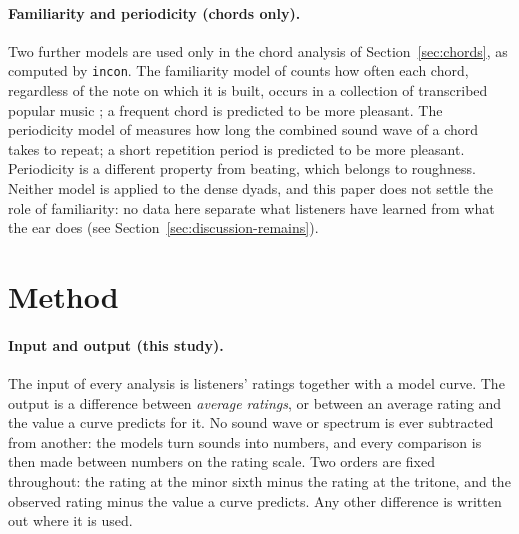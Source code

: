 \documentclass[11pt,a4paper]{article}
\begin{document}
\paragraph{Familiarity and periodicity (chords only).}
Two further models are used only in the chord analysis of Section~\ref{sec:chords}, as
computed by \texttt{incon}. The familiarity model of \citet{harrison2020} counts how often
each chord, regardless of the note on which it is built, occurs in a collection of transcribed popular music \citep{burgoyne2011}; a
frequent chord is predicted to be more pleasant. The periodicity model of
\citet{stolzenburg2015} measures how long the combined sound wave of a chord takes to repeat;
a short repetition period is predicted to be more pleasant. Periodicity is a different
property from beating, which belongs to roughness. Neither model is applied to the dense
dyads, and this paper does not settle the role of familiarity: no data here separate what
listeners have learned from what the ear does (see Section~\ref{sec:discussion-remains}).

\section{Method}
\label{sec:estimands}

\paragraph{Input and output (this study).}
The input of every analysis is listeners' ratings together with a model curve. The output is
a difference between \emph{average ratings}, or between an average rating and the value a
curve predicts for it. No sound wave or spectrum is ever subtracted from another: the models
turn sounds into numbers, and every comparison is then made between numbers on the rating
scale. Two orders are fixed throughout: the rating at the minor sixth minus the rating at the
tritone, and the observed rating minus the value a curve predicts. Any other difference is
written out where it is used.
\end{document}
